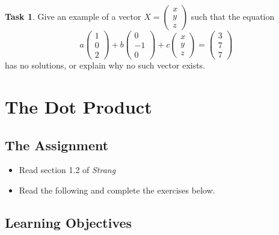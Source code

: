 \documentclass[10pt,]{book}
\theoremstyle{plain}
\theoremstyle{definition}
\numberwithin{equation}{section}
\newtheorem{task}{Task}[chapter]
\begin{document}
\begin{task}
\label{task-12}
Give an example of a vector \(X = \begin{pmatrix} x \\ y \\ z\end{pmatrix}\) such that the equation \[ a \begin{pmatrix} 1 \\ 0 \\ 2 \end{pmatrix} + b \begin{pmatrix} 0 \\ -1 \\ 0\end{pmatrix} + c \begin{pmatrix} x \\ y \\ z\end{pmatrix} = \begin{pmatrix}3 \\ 7 \\ 7 \end{pmatrix}\] has no solutions, or explain why no such vector exists.%
\end{task}
\clearpage
\typeout{************************************************}
\typeout{************************************************}
\section[The Dot Product]{The Dot Product}\label{dot-product}
\typeout{************************************************}
\typeout{************************************************}
\subsection[The Assignment]{The Assignment}\label{subsection-5}
\begin{itemize}
\item{}Read section 1.2 of \emph{Strang}\item{}Read the following and complete the exercises below.\end{itemize}
\typeout{************************************************}
\typeout{************************************************}
\subsection[Learning Objectives]{Learning Objectives}\label{subsection-6}
\end{document}

